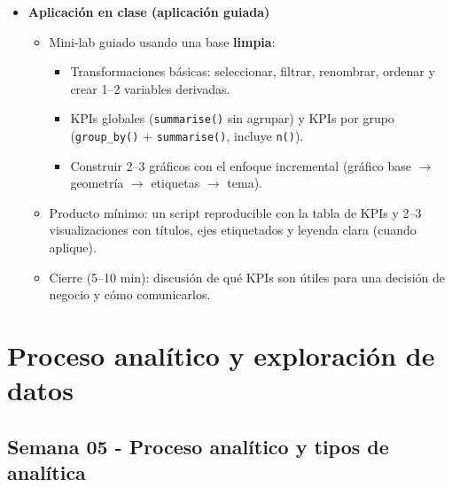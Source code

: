 \documentclass{article}
\begin{document}
\begin{itemize}
\item \textbf{Aplicación en clase (aplicación guiada)}
\begin{itemize}
  \item Mini-lab guiado usando una base \textbf{limpia}:
  \begin{itemize}
    \item Transformaciones básicas: seleccionar, filtrar, renombrar, ordenar y crear 1--2 variables derivadas.
    \item KPIs globales (\texttt{summarise()} sin agrupar) y KPIs por grupo (\texttt{group\_by()} + \texttt{summarise()}, incluye \texttt{n()}).
    \item Construir 2--3 gráficos con el enfoque incremental (gráfico base $\rightarrow$ geometría $\rightarrow$ etiquetas $\rightarrow$ tema).
  \end{itemize}
  \item Producto mínimo: un script reproducible con la tabla de KPIs y 2--3 visualizaciones con títulos, ejes etiquetados y leyenda clara (cuando aplique).
  \item Cierre (5--10 min): discusión de qué KPIs son útiles para una decisión de negocio y cómo comunicarlos.
\end{itemize}
\end{itemize}

\newpage
\section{Proceso analítico y exploración de datos}

\subsection{Semana 05 - Proceso analítico y tipos de analítica}
\vspace{0.2 cm}
\end{document}
